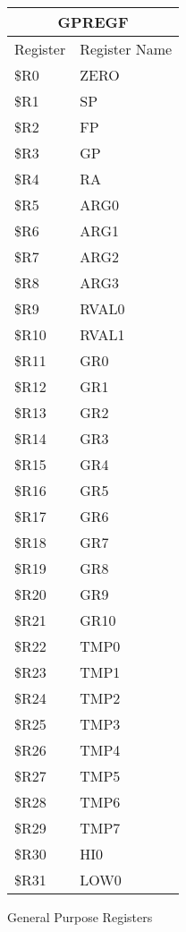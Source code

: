 \documentclass[letterpaper, 11pt]{article}
\begin{document}
\begin{figure}[!h]
	\caption{General Purpose Registers}
	\parbox{0.5\linewidth}{
		\centering
		\fontsize{10}{12}\selectfont
		\begin{tabular}{|l|l|}
			\hline
			\multicolumn{2}{|c|}{GPREGF} \\
			\hline
			Register & Register Name \\ \hline
			\$R0  & ZERO \\ 	\hline
			\$R1  & SP \\ 	\hline
			\$R2  & FP \\ 	\hline
			\$R3  & GP \\ 	\hline
			\$R4  & RA \\ 	\hline
			\$R5  & ARG0 \\ 	\hline
			\$R6  & ARG1 \\ 	\hline
			\$R7  & ARG2 \\ 	\hline
			\$R8  & ARG3 \\ 	\hline
			\$R9  & RVAL0 \\ 	\hline
			\$R10 & RVAL1 \\ \hline
			\$R11 & GR0  \\ \hline
			\$R12 & GR1  \\ \hline
			\$R13 & GR2  \\ \hline
			\$R14 & GR3  \\ \hline
			\$R15 & GR4  \\ \hline
			\$R16 & GR5  \\ \hline
			\$R17 & GR6  \\ \hline
			\$R18 & GR7  \\ \hline
			\$R19 & GR8  \\ \hline
			\$R20 & GR9  \\ \hline
			\$R21 & GR10  \\ \hline
			\$R22 & TMP0  \\ \hline
			\$R23 & TMP1 \\ \hline
			\$R24 & TMP2  \\ \hline
			\$R25 & TMP3  \\ \hline
			\$R26 & TMP4  \\ \hline
			\$R27 & TMP5  \\ \hline
			\$R28 & TMP6  \\ \hline
			\$R29 & TMP7  \\ \hline
			\$R30 & HI0  \\ \hline
			\$R31 & LOW0  \\ \hline
		\end{tabular}
}
\end{figure}
\end{document}
